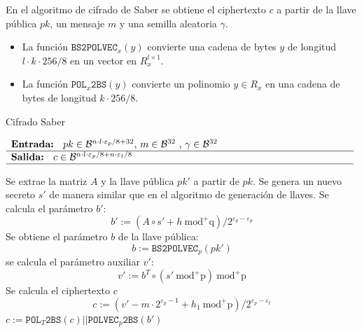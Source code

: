 \newpage

En el algoritmo de cifrado de Saber se obtiene el ciphertexto \(c\) a partir de la llave pública \(pk\), un mensaje \(m\) y una semilla aleatoria \(\gamma\).
\begin{itemize}
	\item La función $\texttt{BS2POLVEC}_x(y)$ convierte una cadena de bytes \(y\) de longitud \(l\cdot k \cdot 256/8\) en un vector en \(R_x^{l\times 1}\).
	\item La función $\texttt{POL}_x\texttt{2BS}(y)$ convierte un polinomio \(y\in R_x\) en una cadena de bytes de longitud \(k\cdot 256/8\).
\end{itemize}
\begin{algorithm}[H]
	\small
	\caption{Cifrado Saber}
	$\begin{array}{p{\textwidth}}
		\textbf{Entrada: } \(pk\in \mathcal{B}^{n\cdot l \cdot \varepsilon_p/8+32}\), \(m\in \mathcal{B}^{32}\) , \(\gamma\in \mathcal{B}^{32}\)\\ 
		\hline
		\textbf{Salida: } \(c\in \mathcal{B}^{n\cdot l\cdot \varepsilon_p/8+n\cdot \varepsilon_t/8}\)\\ 
		\hline
	\end{array}$
	\begin{algorithmic}[1]
		\State Se extrae la matriz \(A\) y la llave pública \(pk'\) a partir de \(pk\).
		\State Se genera un nuevo secreto \(s'\) de manera similar que en el algoritmo de generación de llaves.
		\State Se calcula el parámetro \(b'\):
		\begin{equation}
			b':=\left(A\circ s' + h  \ \text{mod}^{+}\text{q}\right) / 2^{\varepsilon_q-\varepsilon_p} 
		\end{equation}
		\State Se obtiene el parámetro \(b\) de la llave pública:
		\begin{equation}
			b:=\texttt{BS2POLVEC}_p(pk')
		\end{equation}
		\State se calcula el parámetro auxiliar \(v'\):
		\begin{equation}
			v':= b^T \circ (s' \ \text{mod}^{+}\text{p}) \ \text{mod}^{+}\text{p}
		\end{equation}
		\State Se calcula el ciphertexto \(c\)
		\begin{equation}
			c:=(v'-m\cdot 2^{\varepsilon_p-1}+h_1 \ \text{mod}^{+}\text{p} )/2^{\varepsilon_p-\varepsilon_t}
		\end{equation}
		\State \Return \(c:=\texttt{POL}_T\texttt{2BS}(c)||\texttt{POLVEC}_p\texttt{2BS}(b')\)
	\end{algorithmic}
\end{algorithm}
 

